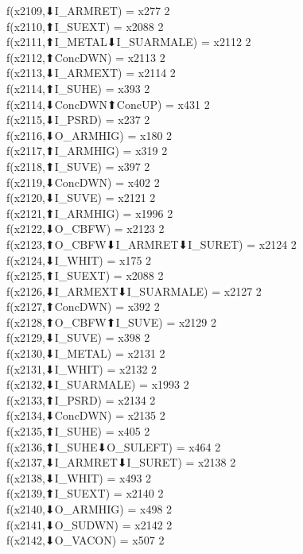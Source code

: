 f(x2109,⬇I_ARMRET) = x277 {2} \\
f(x2110,⬆I_SUEXT) = x2088 {2} \\
f(x2111,⬆I_METAL⬇I_SUARMALE) = x2112 {2} \\
f(x2112,⬆ConcDWN) = x2113 {2} \\
f(x2113,⬇I_ARMEXT) = x2114 {2} \\
f(x2114,⬆I_SUHE) = x393 {2} \\
f(x2114,⬇ConcDWN⬆ConcUP) = x431 {2} \\
f(x2115,⬇I_PSRD) = x237 {2} \\
f(x2116,⬇O_ARMHIG) = x180 {2} \\
f(x2117,⬆I_ARMHIG) = x319 {2} \\
f(x2118,⬆I_SUVE) = x397 {2} \\
f(x2119,⬇ConcDWN) = x402 {2} \\
f(x2120,⬇I_SUVE) = x2121 {2} \\
f(x2121,⬆I_ARMHIG) = x1996 {2} \\
f(x2122,⬇O_CBFW) = x2123 {2} \\
f(x2123,⬆O_CBFW⬇I_ARMRET⬇I_SURET) = x2124 {2} \\
f(x2124,⬇I_WHIT) = x175 {2} \\
f(x2125,⬆I_SUEXT) = x2088 {2} \\
f(x2126,⬇I_ARMEXT⬇I_SUARMALE) = x2127 {2} \\
f(x2127,⬆ConcDWN) = x392 {2} \\
f(x2128,⬆O_CBFW⬆I_SUVE) = x2129 {2} \\
f(x2129,⬇I_SUVE) = x398 {2} \\
f(x2130,⬇I_METAL) = x2131 {2} \\
f(x2131,⬇I_WHIT) = x2132 {2} \\
f(x2132,⬇I_SUARMALE) = x1993 {2} \\
f(x2133,⬆I_PSRD) = x2134 {2} \\
f(x2134,⬇ConcDWN) = x2135 {2} \\
f(x2135,⬆I_SUHE) = x405 {2} \\
f(x2136,⬆I_SUHE⬇O_SULEFT) = x464 {2} \\
f(x2137,⬇I_ARMRET⬇I_SURET) = x2138 {2} \\
f(x2138,⬇I_WHIT) = x493 {2} \\
f(x2139,⬆I_SUEXT) = x2140 {2} \\
f(x2140,⬇O_ARMHIG) = x498 {2} \\
f(x2141,⬇O_SUDWN) = x2142 {2} \\
f(x2142,⬇O_VACON) = x507 {2} \\
